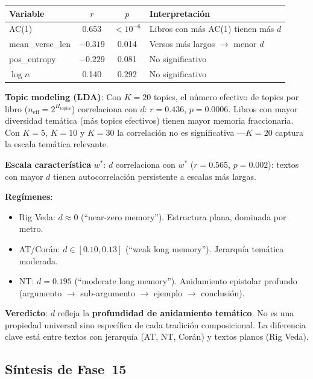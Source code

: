 \documentclass[12pt,a4paper]{article}
\begin{document}
\begin{center}
\begin{tabular}{lccl}
\toprule
\textbf{Variable} & $r$ & $p$ & \textbf{Interpretaci\'on} \\
\midrule
AC(1)         & 0.653 & $< 10^{-6}$ & Libros con m\'as AC(1) tienen m\'as $d$ \\
mean\_verse\_len & $-0.319$ & 0.014 & Versos m\'as largos $\to$ menor $d$ \\
pos\_entropy  & $-0.229$ & 0.081 & No significativo \\
$\log n$      & 0.140 & 0.292 & No significativo \\
\bottomrule
\end{tabular}
\end{center}

\textbf{Topic modeling (LDA)}: Con $K = 20$ topics, el n\'umero efectivo de
topics por libro ($n_{\text{eff}} = 2^{H_{\text{topics}}}$) correlaciona con $d$:
$r = 0.436$, $p = 0.0006$. Libros con mayor diversidad tem\'atica (m\'as topics
efectivos) tienen mayor memoria fraccionaria. Con $K = 5$, $K = 10$ y $K = 30$
la correlaci\'on no es significativa ---$K = 20$ captura la escala tem\'atica relevante.

\textbf{Escala caracter\'istica} $w^*$: $d$ correlaciona con $w^*$
($r = 0.565$, $p = 0.002$): textos con mayor $d$ tienen autocorrelaci\'on
persistente a escalas m\'as largas.

\textbf{Reg\'imenes}:
\begin{itemize}[leftmargin=2em]
\item Rig Veda: $d \approx 0$ (``near-zero memory''). Estructura plana, dominada por metro.
\item AT/Cor\'an: $d \in [0.10, 0.13]$ (``weak long memory''). Jerarqu\'ia tem\'atica moderada.
\item NT: $d = 0.195$ (``moderate long memory''). Anidamiento epistolar profundo
      (argumento $\to$ sub-argumento $\to$ ejemplo $\to$ conclusi\'on).
\end{itemize}

\textbf{Veredicto}: $d$ refleja la \textbf{profundidad de anidamiento tem\'atico}.
No es una propiedad universal sino espec\'ifica de cada tradici\'on composicional.
La diferencia clave est\'a entre textos con jerarqu\'ia (AT, NT, Cor\'an) y textos
planos (Rig Veda).

\subsection{S\'intesis de Fase~15}
\end{document}
